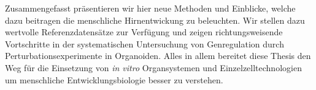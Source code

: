 Zusammengefasst präsentieren wir hier neue Methoden und Einblicke, welche dazu beitragen die menschliche Hirnentwickung zu beleuchten. Wir stellen dazu wertvolle Referenzdatensätze zur Verfügung und zeigen richtungsweisende Vortschritte in der systematischen Untersuchung von Genregulation durch Perturbationsexperimente in Organoiden. Alles in allem bereitet diese Thesis den Weg für die Einsetzung von \textit{in vitro} Organsystemen und Einzelzelltechnologien um menschliche Entwicklungsbiologie besser zu verstehen.